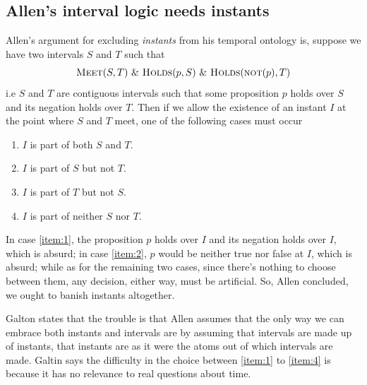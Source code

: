 \subsection{Allen's interval logic needs instants}
Allen's argument for excluding \textit{instants} from his temporal ontology is, suppose we have two intervals $S$ and $T$ such that
\[
	\textsc{Meet}(S, T) \  \& \  \textsc{Holds}(p, S) \ \&  \ \textsc{Holds}(\textsc{not}(p), T)
\]
i.e $S$ and $T$ are contiguous intervals such that some proposition $p$ holds over $S$ and its negation holds over $T$. Then if we allow the existence of an instant $I$ at the point where $S$ and $T$ meet, one of the following cases must occur
\begin{enumerate}[label=(\arabic*)]
  \item  $I$ is part of both $S$ and $T$.\label{item:1}
	\item  $I$ is part of $S$ but not $T$.\label{item:2}
	\item  $I$ is part of $T$ but not $S$. \label{item:3}
	\item  $I$ is part of neither $S$ nor $T$. \label{item:4}
\end{enumerate}
In case \ref{item:1}, the proposition $p$ holds over $I$ and its negation holds over $I$, which is absurd;
in case \ref{item:2}, $p$ would be neither true nor false at $I$, which is absurd;
while as for the remaining two cases, since there's nothing to choose between them, any decision, either way, must be artificial. So, Allen concluded, we ought to banish instants altogether.

Galton states that the trouble is that Allen assumes that the only way we can embrace both instants and
intervals are by assuming that intervals are made up of instants, that instants are as it were the atoms out of which intervals are made.
Galtin says the difficulty in the choice between \ref{item:1} to \ref{item:4} is because it has no relevance to real questions about time.

%
%
%
%

